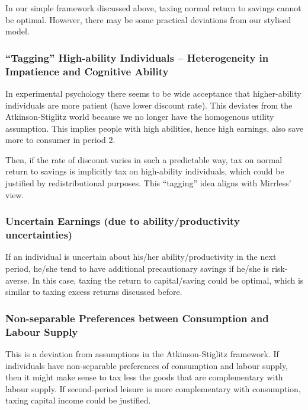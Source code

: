         In our simple framework discussed above, taxing normal return to savings cannot be optimal. However, there may be some practical deviations from our stylised model.

        \subsubsection{``Tagging'' High-ability Individuals -- Heterogeneity in Impatience and Cognitive Ability}

            In experimental psychology there seems to be wide acceptance that higher-ability individuals are more patient (have lower discount rate). This deviates from the Atkinson-Stiglitz world because we no longer have the homogenous utility assumption. This implies people with high abilities, hence high earnings, also save more to consumer in period 2.

            Then, if the rate of discount varies in such a predictable way, tax on normal return to savings is implicitly tax on high-ability individuals, which could be justified by redistributional purposes. This ``tagging'' idea aligns with Mirrless' view.

        \subsubsection{Uncertain Earnings (due to ability/productivity uncertainties)}

            If an individual is uncertain about his/her ability/productivity in the next period, he/she tend to have additional precautionary savings if he/she is risk-averse. In this case, taxing the return to capital/saving could be optimal, which is similar to taxing excess returns discussed before.

        \subsubsection{Non-separable Preferences between Consumption and Labour Supply}\label{subsubsec:non_separable_pref}

            This is a deviation from assumptions in the Atkinson-Stiglitz framework. If individuals have non-separable preferences of consumption and labour supply, then it might make sense to tax less the goods that are complementary with labour supply. If second-period leisure is more complementary with consumption, taxing capital income could be justified.